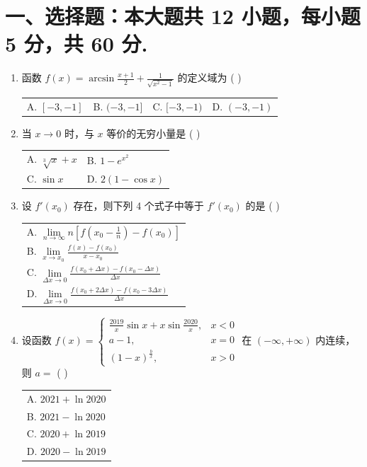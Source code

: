 \documentclass[10pt, a3paper, landscape, twocolumn]{article}
\begin{document}

\section*{一、选择题：本大题共 12 小题，每小题 5 分，共 60 分.}

\begin{enumerate}
    \item 函数 $f(x) = \arcsin \frac{x+1}{2} + \frac{1}{\sqrt{x^2-1}}$ 的定义域为 ( \quad ) \\
    \begin{tabularx}{\linewidth}{@{} *{4}{X} @{}}
        A. $[-3,-1]$ & B. $(-3,-1]$ & C. $[-3,-1)$ & D. $(-3,-1)$
    \end{tabularx}

    \item 当 $x \to 0$ 时，与 $x$ 等价的无穷小量是 ( \quad ) \\
    \begin{tabularx}{\linewidth}{@{} *{2}{X} @{}}
        A. $\sqrt[3]{x} + x$ & B. $1 - e^{x^2}$ \\
        C. $\sin x$        & D. $2(1-\cos x)$
    \end{tabularx}

    \item 设 $f'(x_0)$ 存在，则下列 4 个式子中等于 $f'(x_0)$ 的是 ( \quad ) \\
    \begin{tabularx}{\linewidth}{@{} X @{}}
        A. $\lim\limits_{n \to \infty} n \left[ f\left(x_0 - \frac{1}{n}\right) - f(x_0) \right]$ \\
        B. $\lim\limits_{x \to x_0} \frac{f(x) - f(x_0)}{x - x_0}$ \\
        C. $\lim\limits_{\Delta x \to 0} \frac{f(x_0 + \Delta x) - f(x_0 - \Delta x)}{\Delta x}$ \\
        D. $\lim\limits_{\Delta x \to 0} \frac{f(x_0 + 2\Delta x) - f(x_0 - 3\Delta x)}{\Delta x}$
    \end{tabularx}

    \item 设函数 
    $f(x) = \begin{cases} 
    \frac{2019}{x} \sin x + x \sin \frac{2020}{x}, & x < 0 \\
    a - 1, & x = 0 \\
    (1 - x)^{\frac{b}{x}}, & x > 0
    \end{cases}$ 
    在 $(-\infty, +\infty)$ 内连续，则 $a = $ ( \quad ) \\
    \begin{tabularx}{\linewidth}{@{} *{1}{X} @{}}
        A. $2021 + \ln 2020$ \\
        B. $2021 - \ln 2020$ \\
        C. $2020 + \ln 2019$ \\
        D. $2020 - \ln 2019$
    \end{tabularx}


\end{enumerate}
\end{document}
